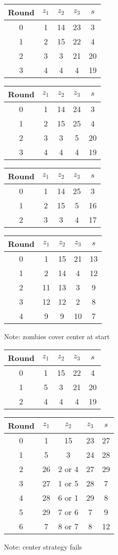 \begin{tabular}{c | c | c | c | c }
Round & $z_1$ & $z_2$ & $z_3$ & $s$ \\
\hline
0 & 1 & 14 & 23 & 3 \\
1 & 2 & 15 & 22 & 4 \\
2 & 3 & 3 & 21 & 20 \\
3 & 4 & 4 & 4 & 19
\end{tabular}

\begin{tabular}{c | c | c | c | c }
Round & $z_1$ & $z_2$ & $z_3$ & $s$ \\
\hline
0 & 1 & 14 & 24 & 3 \\
1 & 2 & 15 & 25 & 4 \\
2 & 3 & 3 & 5 & 20 \\
3 & 4 & 4 & 4 & 19
\end{tabular}

\begin{tabular}{c | c | c | c | c }
Round & $z_1$ & $z_2$ & $z_3$ & $s$ \\
\hline
0 & 1 & 14 & 25 & 3 \\
1 & 2 & 15 & 5 & 16 \\
2 & 3 & 3 & 4 & 17
\end{tabular}

\begin{tabular}{c | c | c | c | c }
Round & $z_1$ & $z_2$ & $z_3$ & $s$ \\
\hline
0 & 1 & 15 & 21 & 13 \\
1 & 2 & 14 & 4 & 12 \\
2 & 11 & 13 & 3 & 9 \\
3 & 12 & 12 & 2 & 8 \\
4 & 9 & 9 & 10 & 7
\end{tabular}
Note: zombies cover center at start

\begin{tabular}{c | c | c | c | c }
Round & $z_1$ & $z_2$ & $z_3$ & $s$ \\
\hline
0 & 1 & 15 & 22 & 4 \\
1 & 5 & 3 & 21 & 20 \\
2 & 4 & 4 & 4 & 19
\end{tabular}

\begin{tabular}{c | c | c | c | c }
Round & $z_1$ & $z_2$ & $z_3$ & $s$ \\
\hline
0 & 1 & 15 & 23 & 27 \\
1 & 5 & 3 & 24 & 28 \\
2 & 26 & 2 or 4 & 27 & 29 \\
3 & 27 & 1 or 5 & 28 & 7 \\
4 & 28 & 6 or 1 & 29 & 8 \\
5 & 29 & 7 or 6 & 7 & 9 \\
6 & 7 & 8 or 7 & 8 & 12
\end{tabular}
Note: center strategy fails


